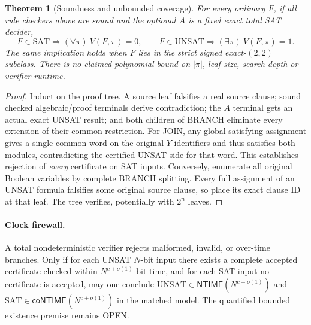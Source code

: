\documentclass[11pt]{article}
\newtheorem{theorem}{Theorem}
\begin{document}
\begin{theorem}[Soundness and unbounded coverage]
For every ordinary $F$, if all rule checkers above are sound and the
optional $A$ is a fixed exact total SAT decider,
\[
F\in\mathrm{SAT}\Rightarrow(\forall\pi)\ V(F,\pi)=0,
\qquad
F\in\mathrm{UNSAT}\Rightarrow(\exists\pi)\ V(F,\pi)=1.
\]
The same implication holds when $F$ lies in the strict signed
exact-$(2,2)$ subclass. There is no claimed polynomial bound
on $|\pi|$, leaf size, search depth or verifier runtime.
\end{theorem}
\begin{proof}
Induct on the proof tree. A source leaf falsifies a real source
clause; sound checked algebraic/proof terminals derive contradiction;
the $A$ terminal gets an actual exact UNSAT result; and both children
of BRANCH eliminate every extension of their common restriction.
For JOIN, any global satisfying assignment gives a single common
word on the original $Y$ identifiers and thus satisfies both
modules, contradicting the certified UNSAT side for that word.
This establishes rejection of \emph{every} certificate on SAT inputs.
Conversely, enumerate all original Boolean variables by complete
BRANCH splitting. Every full assignment of an UNSAT formula falsifies
some original source clause, so place its exact clause ID at that leaf.
The tree verifies, potentially with $2^n$ leaves.
\end{proof}

\paragraph{Clock firewall.}
A total nondeterministic verifier rejects malformed, invalid, or
over-time branches. Only if for each UNSAT $N$-bit input there
exists a complete accepted certificate checked within
$N^{c+o(1)}$ bit time, and for each SAT input no certificate is
accepted, may one conclude
$\mathrm{UNSAT}\in\mathsf{NTIME}(N^{c+o(1)})$ and
$\mathrm{SAT}\in\mathsf{coNTIME}(N^{c+o(1)})$ in the matched
model. The quantified bounded existence premise remains OPEN.
\end{document}
